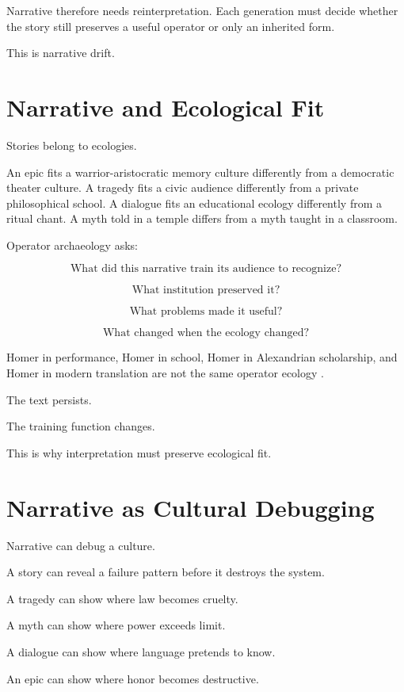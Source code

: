 \documentclass[11pt]{book}
\begin{document}
Narrative therefore needs reinterpretation. Each generation must decide whether the story still preserves a useful operator or only an inherited form.

This is narrative drift.

\section{Narrative and Ecological Fit}

Stories belong to ecologies.

An epic fits a warrior-aristocratic memory culture differently from a democratic theater culture. A tragedy fits a civic audience differently from a private philosophical school. A dialogue fits an educational ecology differently from a ritual chant. A myth told in a temple differs from a myth taught in a classroom.

Operator archaeology asks:

\[
\text{What did this narrative train its audience to recognize?}
\]

\[
\text{What institution preserved it?}
\]

\[
\text{What problems made it useful?}
\]

\[
\text{What changed when the ecology changed?}
\]

Homer in performance, Homer in school, Homer in Alexandrian scholarship, and Homer in modern translation are not the same operator ecology \cite{Lord1960SingerOfTales,Parry1971MakingHomericVerse,Nagy1979BestAchaeans}.

The text persists.

The training function changes.

This is why interpretation must preserve ecological fit.

\section{Narrative as Cultural Debugging}

Narrative can debug a culture.

A story can reveal a failure pattern before it destroys the system.

A tragedy can show where law becomes cruelty.

A myth can show where power exceeds limit.

A dialogue can show where language pretends to know.

An epic can show where honor becomes destructive.
\end{document}

